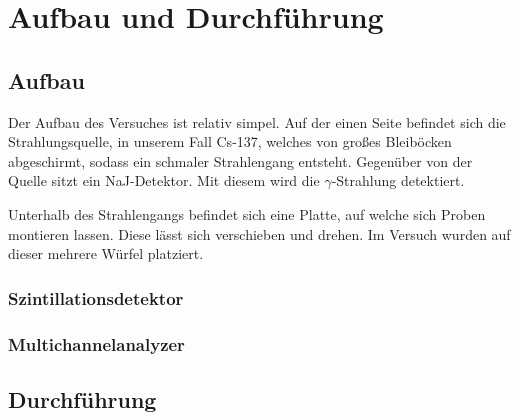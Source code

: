 \section{Aufbau und Durchführung}
\subsection{Aufbau}
Der Aufbau des Versuches ist relativ simpel. Auf der einen Seite befindet sich die Strahlungsquelle, in unserem
Fall Cs-137, welches von großes Bleiböcken abgeschirmt, sodass ein schmaler Strahlengang entsteht. Gegenüber 
von der Quelle sitzt ein NaJ-Detektor. Mit diesem wird die $\gamma$-Strahlung detektiert. 

\noindent
Unterhalb des Strahlengangs befindet sich eine Platte, auf welche sich Proben montieren lassen. Diese lässt 
sich verschieben und drehen. Im Versuch wurden auf dieser mehrere Würfel platziert.

\subsubsection{Szintillationsdetektor}


\subsubsection{Multichannelanalyzer}



\subsection{Durchführung}



